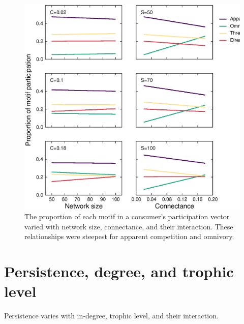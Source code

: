\documentclass[12pt]{article}
\begin{document}
\begin{spacing}{2.0}
    \begin{figure}[ht!]
        \centering
        \includegraphics[height=.4\textheight]{figures/participation_vs_SC.eps}
        \caption{The proportion of each motif in a consumer's participation vector varied with network size, connectance, and their interaction. These relationships were steepest for apparent competition and omnivory.}
        \label{fig:roles_vs_SC}
    \end{figure}
\clearpage 

\section{Persistence, degree, and trophic level}


    Persistence varies with in-degree, trophic level, and their interaction.


\end{spacing}
\end{document}
